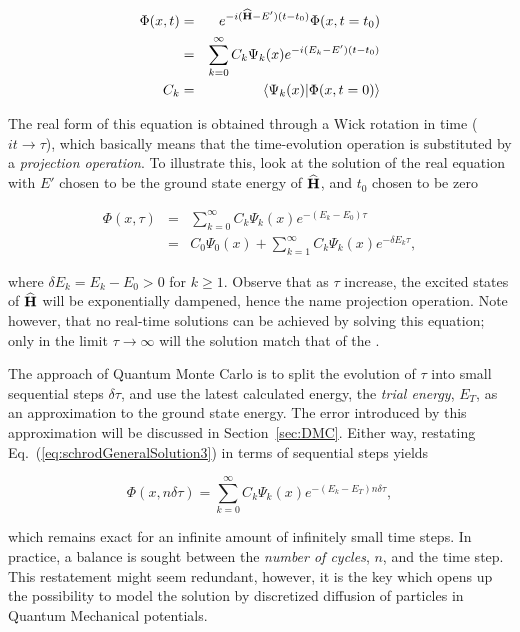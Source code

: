 \begin{eqnarray}
 \Phi(x, t) &=& e^{-i({\bf\widehat{H}} - E')(t-t_0)}\Phi(x, t=t_0) \label{eq:schrodGeneralSolution} \\
            &=& \sum_{k=0}^{\infty} C_k\Psi_k(x)e^{-i(E_k - E')(t-t_0)} \label{eq:realSchrod} \\
 C_k &=& \left\langle \Psi_k(x) | \Phi(x, t=0)\right\rangle \nonumber
 \end{eqnarray}


The real form of this equation is obtained through a Wick rotation in time ($it \rightarrow \tau$), which basically means that the time-evolution operation is substituted by a \textit{projection operation}. To illustrate this, look at the solution of the real equation with $E'$ chosen to be the ground state energy of ${\bf\widehat{H}}$, and $t_0$ chosen to be zero

\begin{eqnarray}
 \Phi(x, \tau) &=& \sum_{k=0}^{\infty} C_k\Psi_k(x)e^{-(E_k - E_0)\tau} \label{eq:schrodGeneralSolution3}\\
                    &=& C_0\Psi_0(x) + \sum_{k=1}^{\infty} C_k\Psi_k(x)e^{-\delta E_k\tau}, \label{eq:schrodGeneralSolution2}
\end{eqnarray}

where $\delta E_k = E_k - E_0 > 0$ for $k \ge 1$. Observe that as $\tau$ increase, the excited states of ${\bf\widehat{H}}$ will be exponentially dampened, hence the name projection operation. Note however, that no real-time solutions can be achieved by solving this equation; only in the limit $\tau\rightarrow\infty$ will the solution match that of the \schrodinger. 

The approach of Quantum Monte Carlo is to split the evolution of $\tau$ into small sequential steps $\delta\tau$, and use the latest calculated energy, the \textit{trial energy}, $E_T$, as an approximation to the ground state energy. The error introduced by this approximation will be discussed in Section~\ref{sec:DMC}. Either way, restating Eq.~(\ref{eq:schrodGeneralSolution3}) in terms of sequential steps yields

\begin{equation}
  \Phi(x, n\delta\tau) = \sum_{k=0}^{\infty} C_k\Psi_k(x)e^{-(E_k - E_T)n\delta\tau} \label{eq:genSolTimeSteps},
\end{equation}

which remains exact for an infinite amount of infinitely small time steps. In practice, a balance is sought between the \textit{number of cycles}, $n$, and the time step. This restatement might seem redundant, however, it is the key which opens up the possibility to model the solution by discretized diffusion of particles in Quantum Mechanical potentials. 


